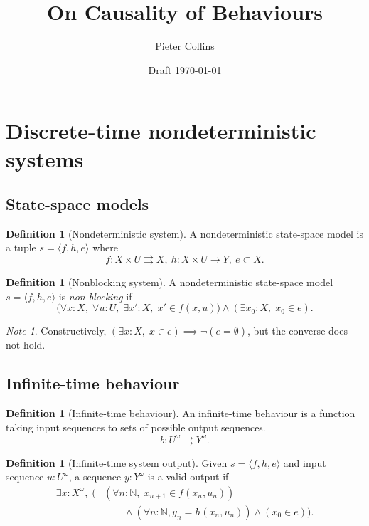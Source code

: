 \documentclass[11pt,a4paper]{article}
\title{On Causality of Behaviours}
\author{Pieter Collins}
\date{Draft \today}
\newcommand{\N}{\mathbb{N}}
\newcommand{\mvto}{\rightrightarrows}
\theoremstyle{theorem}
\theoremstyle{definition}
\newtheorem{definition}[theorem]{Definition}
\theoremstyle{remark}
\newtheorem*{note*}{Note}
\begin{document}
\maketitle

\section{Discrete-time nondeterministic systems}

\subsection{State-space models}

\begin{definition}[Nondeterministic system]
A nondeterministic state-space model is a tuple $s=\langle f,h,e\rangle$ where
\[ f:X\times U \mvto X,\ h:X\times U\to Y,\ e\subset X . \]
\end{definition}

\begin{definition}[Nonblocking system]
A nondeterministic state-space model $s=\langle f,h,e\rangle$ is \emph{non-blocking} if
\[ \bigl(\forall x:X,\;\forall u:U,\;\exists x':X,\; x'\in f(x,u)\bigr) \wedge (\exists x_0:X,\; x_0\in e) . \]
\end{definition}

\begin{note*}
Constructively, $(\exists x : X,\; x\in e) \implies \neg (e = \emptyset)$, but the converse does not hold.
\end{note*}


\subsection{Infinite-time behaviour}

\begin{definition}[Infinite-time behaviour]
An infinite-time behaviour is a function taking input sequences to sets of possible output sequences.
\[ b: U^\omega \mvto Y^\omega . \]
\end{definition}

\begin{definition}[Infinite-time system output]
Given $s=\langle f,h,e\rangle$ and input sequence $u:U^\omega$, a sequence $y:Y^\omega$ is a valid output if
\[ \begin{aligned}
 \exists x : X^\omega,\;\bigl( & (\forall n:\N,\;x_{n+1}\in f(x_n,u_n)) \\ & \qquad \mbox{} \wedge (\forall n:\N, y_n = h(x_n,u_n)) \wedge (x_0 \in e ) \bigr).
\end{aligned} \]
\end{definition}
\end{document}
